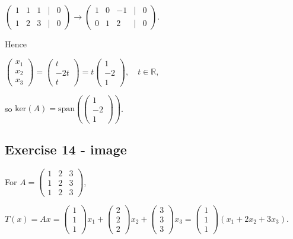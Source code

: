 \(\begin{pmatrix}
1 & 1 & 1 & | & 0 \\
1 & 2 & 3 & | & 0
\end{pmatrix}\rightarrow\begin{pmatrix}
1 & 0 & {- 1} & | & 0 \\
0 & 1 & 2 & | & 0
\end{pmatrix}.\)

Hence

\(\begin{pmatrix}
x_{1} \\
x_{2} \\
x_{3}
\end{pmatrix} = \begin{pmatrix}
t \\
{- 2t} \\
t
\end{pmatrix} = t\begin{pmatrix}
1 \\
{- 2} \\
1
\end{pmatrix},\quad t \in \mathbb{R},\)

so \(\text{ker}(A) = \text{span}\left( \begin{pmatrix}
1 \\
{- 2} \\
1
\end{pmatrix} \right)\).

\subsection{Exercise 14 - image}

For \(A = \begin{pmatrix}
1 & 2 & 3 \\
1 & 2 & 3 \\
1 & 2 & 3
\end{pmatrix}\),

\(T(x) = Ax = \begin{pmatrix}
1 \\
1 \\
1
\end{pmatrix}x_{1} + \begin{pmatrix}
2 \\
2 \\
2
\end{pmatrix}x_{2} + \begin{pmatrix}
3 \\
3 \\
3
\end{pmatrix}x_{3} = \begin{pmatrix}
1 \\
1 \\
1
\end{pmatrix}\left( {x_{1} + 2x_{2} + 3x_{3}} \right).\)

